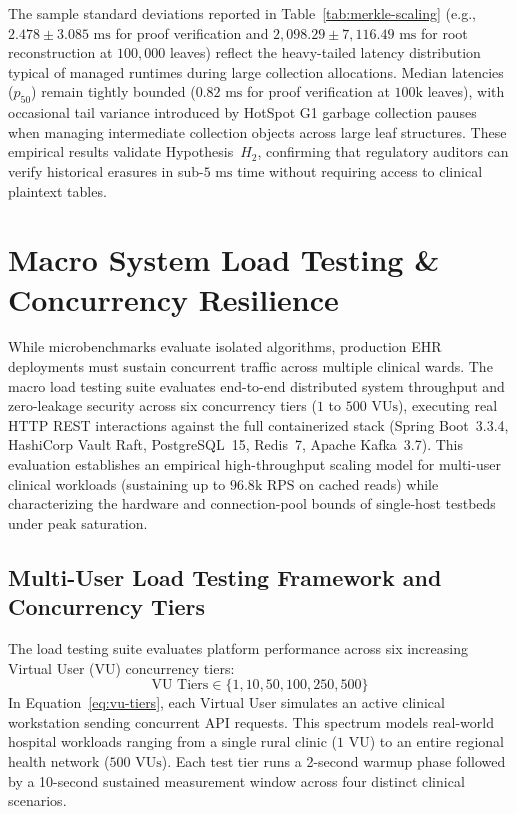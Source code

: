 The sample standard deviations reported in Table~\ref{tab:merkle-scaling} (e.g., $2.478 \pm 3.085\text{~ms}$ for proof verification and $2{,}098.29 \pm 7{,}116.49\text{~ms}$ for root reconstruction at $100{,}000$ leaves) reflect the heavy-tailed latency distribution typical of managed runtimes during large collection allocations. Median latencies ($p_{50}$) remain tightly bounded ($0.82\text{~ms}$ for proof verification at $100\text{k}$ leaves), with occasional tail variance introduced by HotSpot G1 garbage collection pauses when managing intermediate collection objects across large leaf structures. These empirical results validate Hypothesis~$H_2$, confirming that regulatory auditors can verify historical erasures in sub-$5\text{~ms}$ time without requiring access to clinical plaintext tables.


\section{Macro System Load Testing \& Concurrency Resilience}\label{section:load-testing}

While microbenchmarks evaluate isolated algorithms, production EHR deployments must sustain concurrent traffic across multiple clinical wards. The macro load testing suite evaluates end-to-end distributed system throughput and zero-leakage security across six concurrency tiers ($1$ to $500\text{~VUs}$), executing real HTTP REST interactions against the full containerized stack (Spring Boot~3.3.4, HashiCorp Vault Raft, PostgreSQL~15, Redis~7, Apache Kafka~3.7). This evaluation establishes an empirical high-throughput scaling model for multi-user clinical workloads (sustaining up to $96.8\text{k}\text{~RPS}$ on cached reads) while characterizing the hardware and connection-pool bounds of single-host testbeds under peak saturation.

\subsection{Multi-User Load Testing Framework and Concurrency Tiers}

The load testing suite evaluates platform performance across six increasing Virtual User (VU) concurrency tiers:
\begin{equation}
    \text{VU Tiers} \in \{1, 10, 50, 100, 250, 500\}
    \label{eq:vu-tiers}
\end{equation}
In Equation~\ref{eq:vu-tiers}, each Virtual User simulates an active clinical workstation sending concurrent API requests. This spectrum models real-world hospital workloads ranging from a single rural clinic ($1\text{~VU}$) to an entire regional health network ($500\text{~VUs}$). Each test tier runs a 2-second warmup phase followed by a 10-second sustained measurement window across four distinct clinical scenarios.

